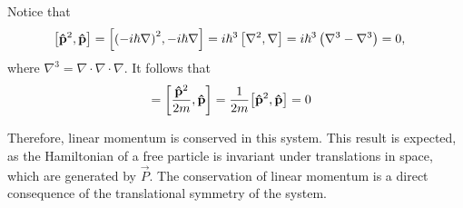 Notice that
\begin{align*}
    \left[ \mathbf{\hat{p}}^2, \mathbf{\hat{p}} \right] &= \left[ {\left( -i\hbar \nabla \right)}^2, -i\hbar \nabla \right] = i\hbar^3 \left[ \nabla^2, \nabla \right] = i\hbar^3 \left( \nabla^3 - \nabla^3 \right) = 0,
\end{align*}
where $\nabla^3 = \nabla\cdot\nabla\cdot\nabla$.
It follows that
\begin{align*}
    [\hat{H},\vh{p}]
        &= \left[\frac{\vh{p}^2}{2m},\vh{p}\right] = \frac{1}{2m}{\left[\vh{p}^2,\vh{p}\right]} = 0
\end{align*}

Therefore, linear momentum is conserved in this system. This result is expected, as the Hamiltonian of a free particle is invariant under translations in space, which are generated by $\vec{P}$. The conservation of linear momentum is a direct consequence of the translational symmetry of the system.


